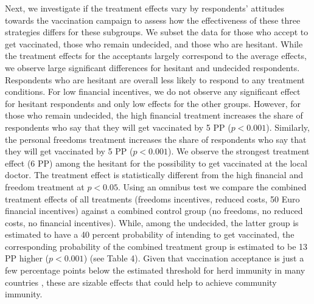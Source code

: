 \documentclass[12pt]{article}
\renewcommand\hl[1]{#1}
\begin{document}
Next, we investigate if the treatment effects vary by respondents' attitudes towards the vaccination campaign 
\hl{to assess how the effectiveness of these three strategies differs for these subgroups}.  
We subset the data for those who accept to get vaccinated, those who remain undecided, and those who are hesitant. While the treatment effects for the acceptants largely correspond to the average effects, we observe large significant differences for hesitant and undecided respondents. Respondents who are hesitant are overall less likely to respond to any treatment conditions. For low financial incentives, we do not observe any significant effect for hesitant respondents and only low effects for the other groups. However, for those who remain undecided, the high financial treatment increases the share of respondents who say that they will get vaccinated by 5 PP ($p < 0.001$). Similarly, the personal freedoms treatment increases the share of respondents who say that they will get vaccinated by 5 PP ($p < 0.001$). We observe the strongest treatment effect (6 PP) among the hesitant for the possibility to get vaccinated at the local doctor. The treatment effect is statistically different from the high financial and freedom treatment at $p < 0.05$. Using an omnibus test we compare the combined treatment effects of all treatments (freedoms incentives, reduced costs, 50 Euro financial incentives) against a combined control group (no freedoms, no reduced costs, no financial incentives). While, among the undecided, the latter group is estimated to have a 40 percent probability of intending to get vaccinated, the corresponding probability of the combined treatment group is estimated to be 13 PP higher ($p < 0.001$) (see Table 4). Given that vaccination acceptance is just a few percentage points below the estimated threshold for herd immunity in many countries \cite{Lazarus2020}, these are sizable effects that could help to achieve community immunity.

\end{document}
